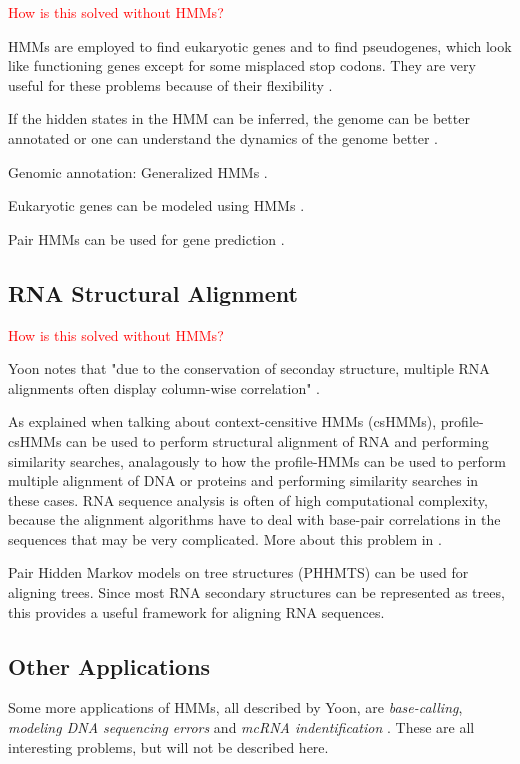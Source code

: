 \documentclass{article}\usepackage[]{graphicx}\usepackage[]{color}
\begin{document}
\textcolor{red}{How is this solved without HMMs?}

HMMs are employed to find eukaryotic genes and to find pseudogenes, which look like functioning genes except for some misplaced stop codons. They are very useful for these problems because of their flexibility \cite{Christianini2006}.

If the hidden states in the HMM can be inferred, the genome can be better annotated or one can understand the dynamics of the genome better \cite{Christianini2006}.

Genomic annotation: Generalized HMMs \cite{Choo2004}.

Eukaryotic genes can be modeled using HMMs \cite{Yoon2009}. 

Pair HMMs can be used for gene prediction \cite{Yoon2009}.

\subsection{RNA Structural Alignment}\label{RNAStructuralAlignment}

\textcolor{red}{How is this solved without HMMs?}

Yoon notes that "due to the conservation of seconday structure, multiple RNA alignments often display column-wise correlation" \cite{Yoon2009}.

As explained when talking about context-censitive HMMs (csHMMs), profile-csHMMs can be used to perform structural alignment of RNA and performing similarity searches, analagously to how the profile-HMMs can be used to perform multiple alignment of DNA or proteins and performing similarity searches in these cases. RNA sequence analysis is often of high computational complexity, because the alignment algorithms have to deal with base-pair correlations in the sequences that may be very complicated. More about this problem in \cite{Yoon2009}.

Pair Hidden Markov models on tree structures (PHHMTS) can be used for aligning trees. Since most RNA secondary structures can be represented as trees, this provides a useful framework for aligning RNA sequences. 

\subsection{Other Applications}
Some more applications of HMMs, all described by Yoon, are \textit{base-calling}, \textit{modeling DNA sequencing errors} and \textit{mcRNA indentification} \cite{Yoon2009}. These are all interesting problems, but will not be described here. 
\end{document}
